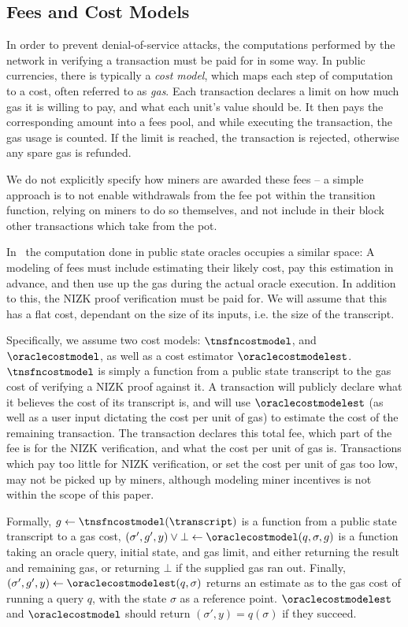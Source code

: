 \subsection{Fees and Cost Models}
\label{sec:fees}

In order to prevent denial-of-service attacks, the computations performed by the
network in verifying a transaction must be paid for in some way. In public
currencies, there is typically a \emph{cost model}, which maps each step of
computation to a cost, often referred to as \emph{gas}. Each transaction declares
a limit on how much gas it is willing to pay, and what each unit's value should
be. It then pays the corresponding amount into a fees pool, and while executing
the transaction, the gas usage is counted. If the limit is reached, the
transaction is rejected, otherwise any spare gas is refunded.

We do not explicitly specify how miners are awarded these fees -- a simple
  approach is to not enable withdrawals from the fee pot within the transition
  function, relying on miners to do so themselves, and not include in their
  block other transactions which take from the pot.

In \kachina\ the computation done in public state oracles occupies a
  similar space: A modeling of fees must include estimating their likely cost,
  pay this estimation in advance, and then use up the gas during the actual
  oracle execution. In addition to this, the NIZK proof verification must be
  paid for. We will assume that this has a flat cost, dependant on the size of
  its inputs, i.e. the size of the transcript.

  Specifically, we assume two cost models: $\tnsfncostmodel$, and
  $\oraclecostmodel$, as well as a cost estimator $\oraclecostmodelest$.
  $\tnsfncostmodel$ is simply a function from a public state transcript to the gas
  cost of verifying a NIZK proof against it. A transaction will publicly declare
  what it believes the cost of its transcript is, and will use
  $\oraclecostmodelest$ (as well as a user input dictating the cost per unit of
  gas) to estimate the cost of the remaining transaction. The transaction
  declares this total fee, which part of the fee is for the NIZK verification,
  and what the cost per unit of gas is. Transactions which pay too little for
  NIZK verification, or set the cost per unit of gas too low, may not be
  picked up by miners, although modeling miner incentives is not within the
  scope of this paper.

  Formally, $g \gets \tnsfncostmodel(\transcript)$ is a function from a public
  state transcript to a gas cost, $(\sigma', g', y) \lor \bot \gets
  \oraclecostmodel(q, \sigma, g)$ is a function taking an oracle query, initial
  state, and gas limit, and either returning the result and remaining gas, or
  returning $\bot$ if the supplied gas ran out. Finally, $(\sigma', g', y) \gets
  \oraclecostmodelest(q, \sigma)$ returns an estimate as to the gas cost of
  running a query $q$, with the state $\sigma$ as a reference point.
  $\oraclecostmodelest$ and $\oraclecostmodel$ should return $(\sigma', y) =
  q(\sigma)$ if they succeed.

